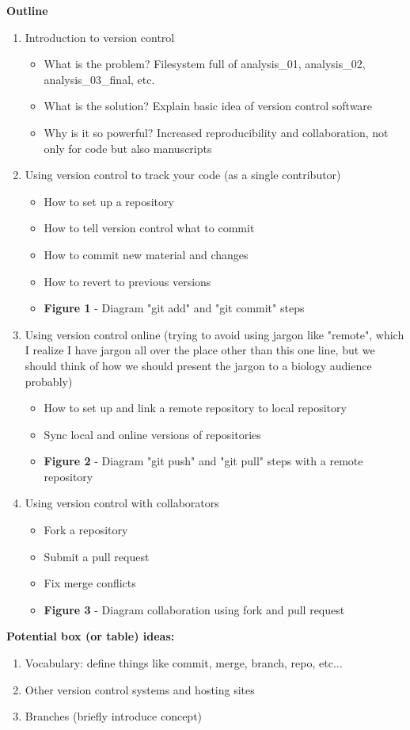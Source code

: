 \textbf{Outline}

\begin{enumerate}
  \item Introduction to version control
  \begin{itemize}
    \item What is the problem? Filesystem full of analysis\_01, analysis\_02, analysis\_03\_final, etc.
    \item What is the solution? Explain basic idea of version control software
    \item Why is it so powerful? Increased reproducibility and collaboration, not only for code but also manuscripts \cite{23448176}
\end{itemize}
  \item Using version control to track your code (as a single contributor)
  \begin{itemize}
    \item How to set up a repository
    \item How to tell version control what to commit
    \item How to commit new material and changes
    \item How to revert to previous versions
    \item \textbf{Figure 1} - Diagram "git add" and "git commit" steps
  \end{itemize}
  \item Using version control online (trying to avoid using jargon like "remote", which I realize I have jargon all over the place other than this one line, but we should think of how we should present the jargon to a biology audience probably)
  \begin{itemize}
    \item How to set up and link a remote repository to local repository
    \item Sync local and online versions of repositories
    \item \textbf{Figure 2} - Diagram "git push" and "git pull" steps with a remote repository
  \end{itemize}
  \item Using version control with collaborators
    \begin{itemize}
      \item Fork a repository
      \item Submit a pull request
      \item Fix merge conflicts
      \item \textbf{Figure 3} - Diagram collaboration using fork and pull request
  \end{itemize}
\end{enumerate}



\textbf{Potential box (or table) ideas:}
\begin{enumerate}
  \item Vocabulary: define things like commit, merge, branch, repo, etc...
  \item Other version control systems and hosting sites
  \item Branches (briefly introduce concept)
\end{enumerate}